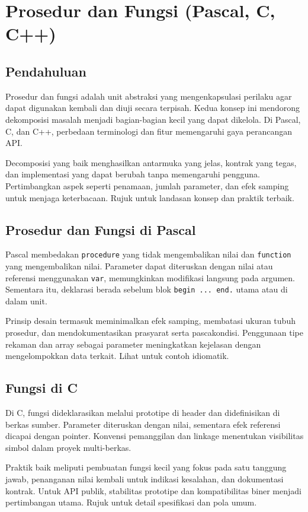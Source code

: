 \documentclass[../main.tex]{subfiles}
\begin{document}
\chapter{Prosedur dan Fungsi (Pascal, C, C++)}
\section{Pendahuluan}
Prosedur dan fungsi adalah unit abstraksi yang mengenkapsulasi perilaku agar dapat digunakan kembali dan diuji secara terpisah. Kedua konsep ini mendorong dekomposisi masalah menjadi bagian-bagian kecil yang dapat dikelola. Di Pascal, C, dan C++, perbedaan terminologi dan fitur memengaruhi gaya perancangan API.

Decomposisi yang baik menghasilkan antarmuka yang jelas, kontrak yang tegas, dan implementasi yang dapat berubah tanpa memengaruhi pengguna. Pertimbangkan aspek seperti penamaan, jumlah parameter, dan efek samping untuk menjaga keterbacaan. Rujuk \textcite{pascal-procedure-function,c-functions,cpp-functions} untuk landasan konsep dan praktik terbaik.

\section{Prosedur dan Fungsi di Pascal}
Pascal membedakan \texttt{procedure} yang tidak mengembalikan nilai dan \texttt{function} yang mengembalikan nilai. Parameter dapat diteruskan dengan nilai atau referensi menggunakan \texttt{var}, memungkinkan modifikasi langsung pada argumen. Sementara itu, deklarasi berada sebelum blok \texttt{begin ... end.} utama atau di dalam unit.

Prinsip desain termasuk meminimalkan efek samping, membatasi ukuran tubuh prosedur, dan mendokumentasikan prasyarat serta pascakondisi. Penggunaan tipe rekaman dan array sebagai parameter meningkatkan kejelasan dengan mengelompokkan data terkait. Lihat \textcite{pascal-procedure-function,free-pascal-docs} untuk contoh idiomatik.

\section{Fungsi di C}
Di C, fungsi dideklarasikan melalui prototipe di header dan didefinisikan di berkas sumber. Parameter diteruskan dengan nilai, sementara efek referensi dicapai dengan pointer. Konvensi pemanggilan dan linkage menentukan visibilitas simbol dalam proyek multi-berkas.

Praktik baik meliputi pembuatan fungsi kecil yang fokus pada satu tanggung jawab, penanganan nilai kembali untuk indikasi kesalahan, dan dokumentasi kontrak. Untuk API publik, stabilitas prototipe dan kompatibilitas biner menjadi pertimbangan utama. Rujuk \textcite{c-functions,gnu-c-manual} untuk detail spesifikasi dan pola umum.
\end{document}
